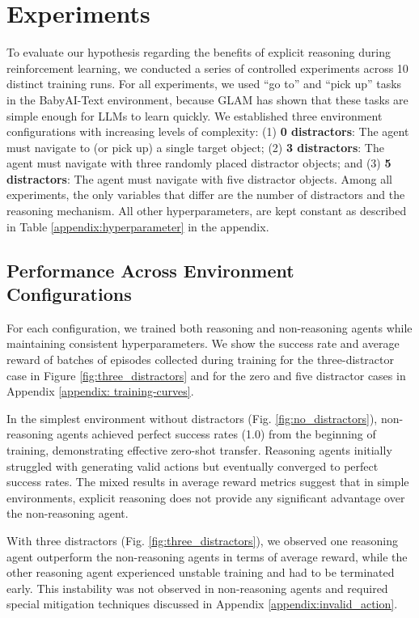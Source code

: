 \documentclass[11pt,a4paper]{article}
\begin{document}
\section{Experiments}
To evaluate our hypothesis regarding the benefits of explicit reasoning during reinforcement learning, 
we conducted a series of controlled experiments across 10 distinct training runs.
For all experiments, we used ``go to'' and ``pick up'' tasks in the BabyAI-Text environment, 
because GLAM \cite{carta2023grounding} has shown that these tasks are simple enough for LLMs to learn quickly.
We established three environment configurations with increasing levels of complexity:
(1) \textbf{0 distractors}: The agent must navigate to (or pick up) a single target object;
(2) \textbf{3 distractors}: The agent must navigate with three randomly placed distractor objects; and
(3) \textbf{5 distractors}: The agent must navigate with five distractor objects.
Among all experiments, the only variables that differ are the number of distractors and the reasoning mechanism.
All other hyperparameters, are kept constant as described in Table \ref{appendix:hyperparameter} in the appendix.
\subsection{Performance Across Environment Configurations}
\label{subsec: 4.1}
For each configuration, we trained both reasoning and non-reasoning agents while maintaining consistent hyperparameters.
We show the success rate and average reward of batches of episodes collected during training for the three-distractor case in Figure \ref{fig:three_distractors} and for the zero and five distractor cases in Appendix \ref{appendix: training-curves}.

In the simplest environment without distractors (Fig. \ref{fig:no_distractors}), non-reasoning agents achieved perfect success rates (1.0) from the beginning of training, 
demonstrating effective zero-shot transfer. Reasoning agents initially struggled with generating valid actions but eventually converged to perfect success rates.
The mixed results in average reward metrics suggest that in simple environments, 
explicit reasoning does not provide any significant advantage over the non-reasoning agent.

With three distractors (Fig. \ref{fig:three_distractors}), we observed one reasoning agent outperform the non-reasoning agents in terms of average reward, 
while the other reasoning agent experienced unstable training and had to be terminated early.
This instability was not observed in non-reasoning agents and required special mitigation techniques discussed in Appendix \ref{appendix:invalid_action}.
\end{document}

